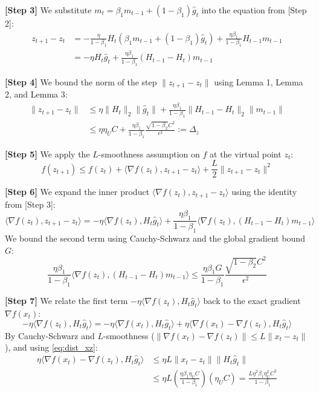 \documentclass{article}
\begin{document}
\textbf{[Step 3]} We substitute $m_t = \beta_1 m_{t-1} + (1-\beta_1) \hat{g}_t$ into the equation from [Step 2]:
\begin{align}
    z_{t+1} - z_t &= - \frac{\eta}{1-\beta_1} H_t (\beta_1 m_{t-1} + (1-\beta_1) \hat{g}_t) + \frac{\eta \beta_1}{1-\beta_1} H_{t-1} m_{t-1} \nonumber \\
    &= - \eta H_t \hat{g}_t + \frac{\eta \beta_1}{1-\beta_1} (H_{t-1} - H_t) m_{t-1}
\end{align}

\textbf{[Step 4]} We bound the norm of the step $\|z_{t+1} - z_t\|$ using Lemma 1, Lemma 2, and Lemma 3:
\begin{align}
    \|z_{t+1} - z_t\| &\leq \eta \|H_t\|_2 \|\hat{g}_t\| + \frac{\eta \beta_1}{1-\beta_1} \|H_{t-1} - H_t\|_2 \|m_{t-1}\| \nonumber \\
    &\leq \eta \eta_U C + \frac{\eta \beta_1}{1-\beta_1} \frac{\sqrt{1-\beta_2} C^2}{\epsilon^2} := \Delta_z
\end{align}

\textbf{[Step 5]} We apply the $L$-smoothness assumption on $f$ at the virtual point $z_t$:
\begin{equation}
    f(z_{t+1}) \leq f(z_t) + \langle \nabla f(z_t), z_{t+1} - z_t \rangle + \frac{L}{2} \|z_{t+1} - z_t\|^2
\end{equation}

\textbf{[Step 6]} We expand the inner product $\langle \nabla f(z_t), z_{t+1} - z_t \rangle$ using the identity from [Step 3]:
\begin{equation}
    \langle \nabla f(z_t), z_{t+1} - z_t \rangle = - \eta \langle \nabla f(z_t), H_t \hat{g}_t \rangle + \frac{\eta \beta_1}{1-\beta_1} \langle \nabla f(z_t), (H_{t-1} - H_t) m_{t-1} \rangle
\end{equation}
We bound the second term using Cauchy-Schwarz and the global gradient bound $G$:
\begin{equation}
    \frac{\eta \beta_1}{1-\beta_1} \langle \nabla f(z_t), (H_{t-1} - H_t) m_{t-1} \rangle \leq \frac{\eta \beta_1 G}{1-\beta_1} \frac{\sqrt{1-\beta_2} C^2}{\epsilon^2}
\end{equation}

\textbf{[Step 7]} We relate the first term $- \eta \langle \nabla f(z_t), H_t \hat{g}_t \rangle$ back to the exact gradient $\nabla f(x_t)$:
\begin{equation}
    - \eta \langle \nabla f(z_t), H_t \hat{g}_t \rangle = - \eta \langle \nabla f(x_t), H_t \hat{g}_t \rangle + \eta \langle \nabla f(x_t) - \nabla f(z_t), H_t \hat{g}_t \rangle
\end{equation}
By Cauchy-Schwarz and $L$-smoothness ($\|\nabla f(x_t) - \nabla f(z_t)\| \leq L \|x_t - z_t\|$), and using \eqref{eq:dist_xz}:
\begin{align}
    \eta \langle \nabla f(x_t) - \nabla f(z_t), H_t \hat{g}_t \rangle &\leq \eta L \|x_t - z_t\| \|H_t \hat{g}_t\| \nonumber \\
    &\leq \eta L \left( \frac{\eta \beta_1 \eta_U C}{1-\beta_1} \right) (\eta_U C) = \frac{L \eta^2 \beta_1 \eta_U^2 C^2}{1-\beta_1}
\end{align}
\end{document}
